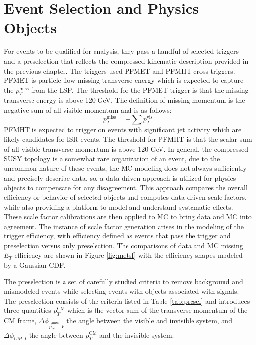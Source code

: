 \section{Event Selection and Physics Objects}
 For events to be qualified for analysis, they pass a handful of selected triggers and a preselection that reflects the compressed kinematic description provided in the previous chapter. The triggers used PFMET and PFMHT cross triggers. PFMET is particle flow missing transverse energy which is expected to capture the $p_T^{\text{miss}}$ from the LSP. The threshold for the PFMET trigger is that the missing transverse energy is above 120 GeV. The definition of missing momentum is the negative sum of all visible momentum and is as follows: 
\begin{equation}
p_T^{\text{miss}} = -\sum{p_T^{\text{vis}}}
\end{equation} 
PFMHT is expected to trigger on events with significant jet activity which are likely candidates for ISR events. The threshold for PFMHT is that the scalar sum of all visible transverse momentum is above 120 GeV.  In general, the compressed SUSY topology is a somewhat rare organization of an event, due to the uncommon nature of these events, the MC modeling does not always sufficiently and precisely describe data, so,  a data driven approach is utilized for physics objects to compensate for any disagreement. This approach compares the overall efficiency or behavior of selected objects and computes data driven scale factors, while also providing a platform to model and understand systematic effects. These scale factor calibrations are then applied to MC to bring data and MC into agreement. The instance of scale factor generation arises in the modeling of the trigger efficiency, with efficiency defined as events that pass the trigger and preselection versus only preselection. The comparisons of data and MC missing $E_T$ efficiency are shown in Figure \ref{fig:metsf} with the efficiency shapes modeled by a Gaussian CDF.  


The preselection is a set of carefully studied criteria to remove background and mismodeled events while selecting events with objects associated with signals. The preselection consists of the criteria listed in Table \ref{tab:presel} and introduces three quantities $p_T^{\text{CM}}$ which is the vector sum of the transverse momentum of the CM frame, $\Delta \phi_{\vec{p}_T^{\text{miss}}, V}$ the angle between the visible and invisible system, and $\Delta\phi_{CM,I}$ the angle between $p_T^{\text{CM}}$ and the invisible system.

